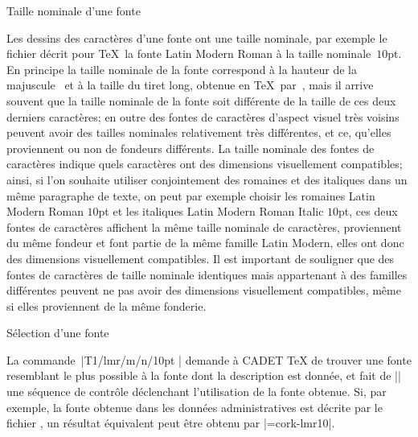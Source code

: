 \formalpar Taille nominale d'une fonte

Les dessins des caractères d'une fonte ont une taille nominale, par
exemple le fichier  décrit pour \TeX\ la fonte Latin
Modern Roman à la taille nominale~$10$pt. En principe la taille
nominale de la fonte correspond à la hauteur de la majuscule~
et à la taille du tiret long, obtenue en \TeX\ par~\li{-{}-{}-}, mais
il arrive souvent que la taille nominale de la fonte soit différente
de la taille de ces deux derniers caractères; en outre des fontes de
caractères d'aspect visuel très voisins peuvent avoir des tailles
nominales relativement très différentes, et ce, qu'elles proviennent
ou non de fondeurs différents. La taille nominale des fontes de
caractères indique quels caractères ont des dimensions visuellement
compatibles; ainsi, si l'on souhaite utiliser conjointement des
romaines et des italiques dans un même paragraphe de texte, on peut
par exemple choisir les romaines Latin Modern Roman $10$pt et les
italiques Latin Modern Roman Italic $10$pt, ces deux fontes de
caractères affichent la même taille nominale de caractères,
proviennent du même fondeur et font partie de la même famille Latin
Modern, elles ont donc des dimensions visuellement compatibles. Il est
important de souligner que des fontes de caractères de taille nominale
identiques mais appartenant à des familles différentes peuvent ne pas
avoir des dimensions visuellement compatibles, même si elles
proviennent de la même fonderie.


\formalpar Sélection d'une fonte

La commande~|\fontwish T1/lmr/m/n/10pt \as\tenrm| demande à CADET \TeX
de trouver une fonte resemblant le plus possible à la fonte dont la
description est donnée, et fait de |\tenrm| une séquence de contrôle
déclenchant l'utilisation de la fonte obtenue. Si, par exemple, la
fonte obtenue dans les données administratives est décrite par le
fichier , un résultat équivalent peut être obtenu par
|\font\tenrm=cork-lmr10|.

